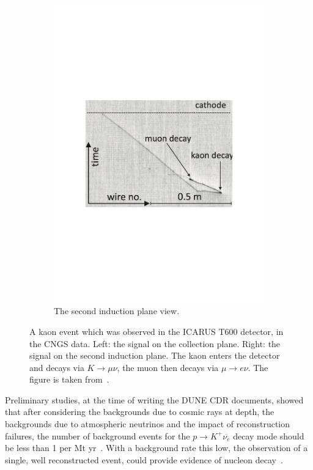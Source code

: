 \begin{figure}
\begin{subfigure}{0.42\textwidth}
    \includegraphics[width=\textwidth]{ICARUSKaon_Ind}
    \caption{The second induction plane view.}
  \end{subfigure}
  \caption[A kaon event which was observed in the ICARUS T600 detector, in the CNGS data]
          {A kaon event which was observed in the ICARUS T600 detector, in the CNGS data. Left: the signal on the collection plane. Right: the signal on the second induction plane. The kaon enters the detector and decays via $K \rightarrow \mu \nu$, the muon then decays via $\mu \rightarrow e \nu$. The figure is taken from~\citep{PMTrack}.}
  \label{fig:ICARUSKaon}
\end{figure}

Preliminary studies, at the time of writing the DUNE CDR documents, showed that after considering the backgrounds due to cosmic rays at depth, the backgrounds due to atmospheric neutrinos and the impact of reconstruction failures, the number of background events for the $p \rightarrow K^{+} \overline{\nu_{e}}$ decay mode should be less than 1 per Mt yr~\citep{Klinger:2015kva, Adams:2013qkq, LBNE8836}. With a background rate this low, the observation of a single, well reconstructed event, could provide evidence of nucleon decay~\citep{DUNECDR_V2}. 

